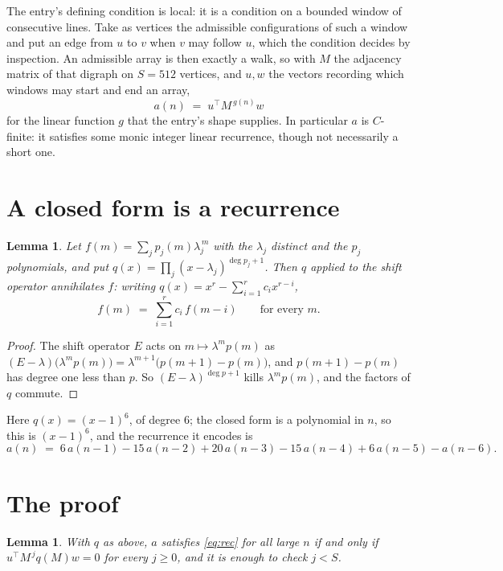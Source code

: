 \documentclass[11pt,a4paper]{article}
\theoremstyle{plain}
\newtheorem{lemma}[theorem]{Lemma}
\theoremstyle{definition}
\begin{document}
The entry's defining condition is local: it is a condition on a bounded window of consecutive lines. Take as vertices the
admissible configurations of such a window and put an edge from $u$ to $v$ when $v$ may
follow $u$, which the condition decides by inspection. An admissible array is then exactly a
walk, so with $M$ the adjacency matrix of that digraph on $S=512$ vertices, and $u,w$ the
vectors recording which windows may start and end an array,
\[
a(n)\;=\;u^{\!\top}M^{\,g(n)}w
\]
for the linear function $g$ that the entry's shape supplies. In particular $a$ is
$C$-finite: it satisfies some monic integer linear recurrence, though not necessarily a short
one.

\section{A closed form is a recurrence}

\begin{lemma}\label{lem:ann}
Let $f(m)=\sum_{j}p_j(m)\lambda_j^{\,m}$ with the $\lambda_j$ distinct and the $p_j$
polynomials, and put $q(x)=\prod_j(x-\lambda_j)^{\deg p_j+1}$. Then $q$ applied to the shift
operator annihilates $f$: writing $q(x)=x^{r}-\sum_{i=1}^{r}c_ix^{r-i}$,
\[
f(m)\;=\;\sum_{i=1}^{r}c_i\,f(m-i)\qquad\text{for every }m.
\]
\end{lemma}

\begin{proof}
The shift operator $E$ acts on $m\mapsto\lambda^{m}p(m)$ as
$(E-\lambda)\bigl(\lambda^{m}p(m)\bigr)=\lambda^{m+1}\bigl(p(m+1)-p(m)\bigr)$, and
$p(m+1)-p(m)$ has degree one less than $p$. So $(E-\lambda)^{\deg p+1}$ kills
$\lambda^{m}p(m)$, and the factors of $q$ commute.
\end{proof}

Here $q(x)=(x-1)^{6}$, of degree $6$; the closed form is a polynomial in $n$, so this is $(x-1)^{6}$, and the recurrence it encodes is
\begin{equation}\label{eq:rec}
a(n)\;=\;6\,a(n-1) - 15\,a(n-2) + 20\,a(n-3) - 15\,a(n-4) + 6\,a(n-5) - a(n-6).
\end{equation}

\section{The proof}

\begin{lemma}\label{lem:crit}
With $q$ as above, $a$ satisfies \eqref{eq:rec} for all large $n$ if and only if
$u^{\!\top}M^{\,j}q(M)w=0$ for every $j\ge0$, and it is enough to check $j<S$.
\end{lemma}
\end{document}
